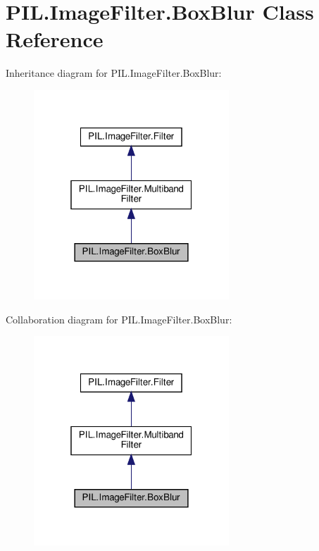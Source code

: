 \hypertarget{classPIL_1_1ImageFilter_1_1BoxBlur}{}\section{P\+I\+L.\+Image\+Filter.\+Box\+Blur Class Reference}
\label{classPIL_1_1ImageFilter_1_1BoxBlur}


Inheritance diagram for P\+I\+L.\+Image\+Filter.\+Box\+Blur\+:
\nopagebreak
\begin{figure}[H]
\begin{center}
\leavevmode
\includegraphics[width=208pt]{classPIL_1_1ImageFilter_1_1BoxBlur__inherit__graph}
\end{center}
\end{figure}


Collaboration diagram for P\+I\+L.\+Image\+Filter.\+Box\+Blur\+:
\nopagebreak
\begin{figure}[H]
\begin{center}
\leavevmode
\includegraphics[width=208pt]{classPIL_1_1ImageFilter_1_1BoxBlur__coll__graph}
\end{center}
\end{figure}
